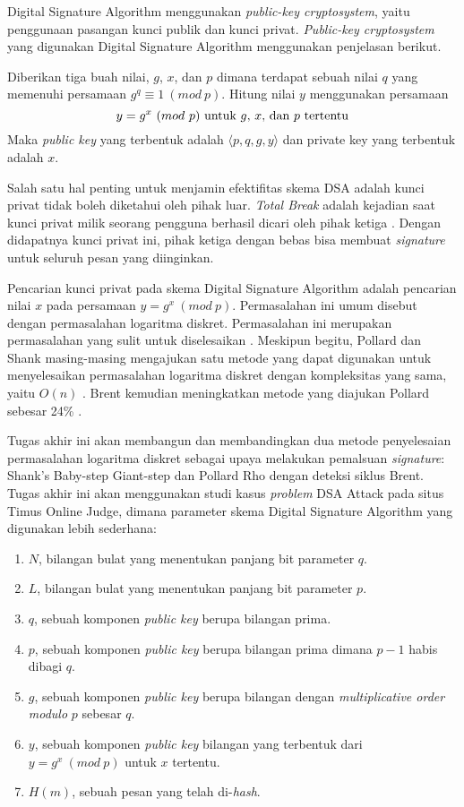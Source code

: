 Digital Signature Algorithm menggunakan \textit{public-key cryptosystem}, yaitu penggunaan pasangan kunci publik dan kunci privat. \textit{Public-key cryptosystem} yang digunakan Digital Signature Algorithm menggunakan penjelasan berikut.

Diberikan tiga buah nilai, $ g $, $ x $, dan $ p $ dimana terdapat sebuah nilai $ q $ yang memenuhi persamaan $ g^q \equiv 1\ (mod\ p) $. Hitung nilai $ y $ menggunakan persamaan
\[
	y = g^x\ (mod\ p) \text{ untuk $ g $, $ x $, dan $ p $ tertentu}
\]
Maka \textit{public key} yang terbentuk adalah $\langle p, q, g, y \rangle$ dan private key yang terbentuk adalah $ x $.

Salah satu hal penting untuk menjamin efektifitas skema DSA adalah kunci privat tidak boleh diketahui oleh pihak luar. \textit{Total Break} adalah kejadian saat kunci privat milik seorang pengguna berhasil dicari oleh pihak ketiga \cite{goldwasser_adaptive_chosen_message}. Dengan didapatnya kunci privat ini, pihak ketiga dengan bebas bisa membuat \textit{signature} untuk seluruh pesan yang diinginkan.

Pencarian kunci privat pada skema Digital Signature Algorithm adalah pencarian nilai $ x $ pada persamaan $ y = g^x\ (mod\ p) $. Permasalahan ini umum disebut dengan permasalahan logaritma diskret. Permasalahan ini merupakan permasalahan yang sulit untuk diselesaikan \cite{stallings_cryptography}. Meskipun begitu, Pollard dan Shank masing-masing mengajukan satu metode yang dapat digunakan untuk menyelesaikan permasalahan logaritma diskret dengan kompleksitas yang sama, yaitu $ O(n) $ \cite{hac_numtheory}. Brent kemudian meningkatkan metode yang diajukan Pollard sebesar 24\% \cite{brent_montecarlo}. 

Tugas akhir ini akan membangun dan membandingkan dua metode penyelesaian permasalahan logaritma diskret sebagai upaya melakukan pemalsuan \textit{signature}: Shank's Baby-step Giant-step dan Pollard Rho dengan deteksi siklus Brent. Tugas akhir ini akan menggunakan studi kasus \textit{problem} DSA Attack pada situs Timus Online Judge, dimana parameter skema Digital Signature Algorithm yang digunakan lebih sederhana:

\begin{enumerate}
	\item $ N $, bilangan bulat yang menentukan panjang bit parameter $ q $.
	\item $ L $, bilangan bulat yang menentukan panjang bit parameter $ p $.
	\item $ q $, sebuah komponen \textit{public key} berupa bilangan prima.
	\item $ p $, sebuah komponen \textit{public key} berupa bilangan prima dimana $ p-1 $ habis dibagi $ q $.
	\item $ g $, sebuah komponen \textit{public key} berupa bilangan dengan \textit{multiplicative order modulo} $ p $ sebesar $ q $.
	\item $ y $, sebuah komponen \textit{public key} bilangan yang terbentuk dari $ y = g^x\ (mod\ p) $ untuk $ x $ tertentu.
	\item $ H(m) $, sebuah pesan yang telah di-\textit{hash}.
\end{enumerate}

